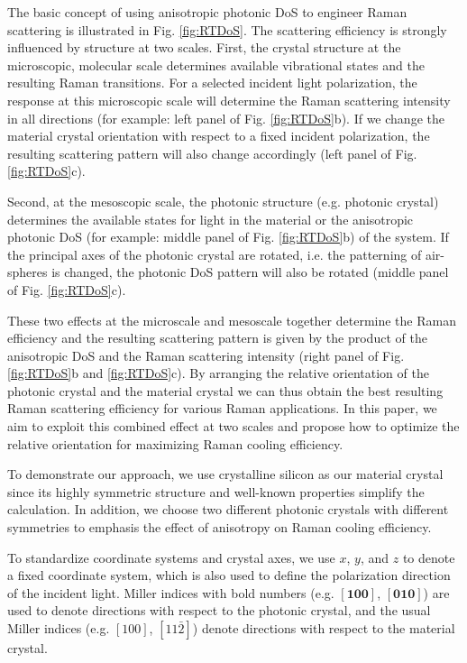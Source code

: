 \documentclass[%
 reprint,
superscriptaddress,
 amsmath,amssymb,
 aps,
pra,
]{revtex4-1}
\begin{document}
%

The basic concept of using anisotropic photonic DoS to engineer Raman scattering is illustrated in Fig. \ref{fig:RTDoS}. The scattering efficiency is strongly influenced by structure at two scales. First, the crystal structure at the microscopic, molecular scale determines available vibrational states and the resulting Raman transitions. For a selected incident light polarization, the response at this microscopic scale will determine the Raman scattering intensity in all directions (for example: left panel of Fig. \ref{fig:RTDoS}b). If we change the material crystal orientation with respect to a fixed incident polarization, the resulting scattering pattern will also change accordingly (left panel of Fig. \ref{fig:RTDoS}c). 




Second, at the mesoscopic scale, the photonic structure (e.g. photonic crystal) determines the available states for light in the material or the anisotropic photonic DoS (for example: middle panel of Fig. \ref{fig:RTDoS}b) of the system. If the principal axes of the photonic crystal are rotated, i.e. the patterning of air-spheres is changed, the photonic DoS pattern will also be rotated (middle panel of Fig. \ref{fig:RTDoS}c). 




These two effects at the microscale and mesoscale together determine the Raman efficiency and the resulting scattering pattern is given by the product of the anisotropic DoS and the Raman scattering intensity (right panel of Fig. \ref{fig:RTDoS}b and \ref{fig:RTDoS}c). By arranging the relative orientation of the photonic crystal and the material crystal we can thus obtain the best resulting Raman scattering efficiency for various Raman applications. In this paper, we aim to exploit this combined effect at two scales and propose how to optimize the relative orientation for maximizing Raman cooling efficiency.



To demonstrate our approach, we use crystalline silicon as our material crystal since its highly symmetric structure and well-known properties simplify the calculation. In addition, we choose two different photonic crystals with different symmetries to emphasis the effect of anisotropy on Raman cooling efficiency.


To standardize coordinate systems and crystal axes, we use $x$, $y$, and $z$ to denote a fixed coordinate system, which is also used to define the polarization direction of the incident light. Miller indices with bold numbers (e.g. $[\textbf{100}]$, $[\textbf{010}]$) are used to denote directions with respect to the photonic crystal, and the usual Miller indices (e.g. $[100]$, $[11\bar{2}]$) denote directions with respect to the material crystal.
\end{document}
